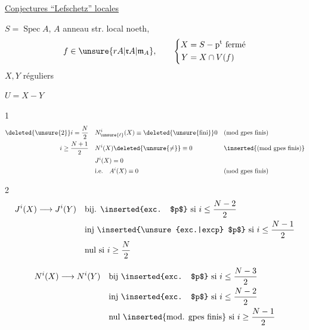 \uline{Conjectures ``Lefschetz'' locales}

$S=\operatorname{Spec} A$, \qquad $A$ anneau str. local noeth,
\[
 f\in\unsure{rA|\mathfrak r A|\mathfrak{m}_A},
 \qquad
 \left\{\begin{aligned}X&=S-\text{p\textsuperscript{t} fermé}\\Y&=X\cap V(f)\end{aligned}\right.
\]
$X,Y$ réguliers

$U=X-Y$

\textcircled{1}
\[
\begin{aligned}
 \deleted{\unsure{2}}i=\frac N2\quad&
 N^i_{\unsure{\ell}}(X)\equiv\deleted{\unsure{\text{fini}}}0
 &&\text{(mod gpes finis)}\\
 i\geq\frac{N+1}{2}\quad& N^i(X)\deleted{\unsure{\neq}}\equiv0
 &&\inserted{\text{(mod gpes finis)}}\\
 &J^i(X)=0\\
 &\text{i.e.}\quad A^i(X)\equiv0 &&\text{(mod gpes finis)}
\end{aligned}
\]

\textcircled{2}
\[
\begin{aligned}
 J^i(X)\longrightarrow J^i(Y) &\quad\text{bij. \inserted{exc. $p$} si }i\leq\frac{N-2}{2}\\
 &\quad\text{inj \inserted{\unsure{exc.|excp} $p$} si }i\leq\frac{N-1}{2}\\
 &\quad\text{nul si }i\geq\frac N2
\end{aligned}
\]
\margin{[N.B. Si $i\geq\frac N2$, $J^i(Y)=0$ ! d'ailleurs si $i\geq\frac{N+1}2$ on a $J^i(X)=J^i(Y)=0$]}

\[
\begin{aligned}
 N^i(X)\longrightarrow N^i(Y)&\quad\text{bij \inserted{exc. $p$} si } i\leq\frac{N-3}2\\
 &\quad\text{inj \inserted{exc. $p$} si } i\leq\frac{N-2}2\\
 &\quad\text{nul \inserted{mod. gpes finis} si } i\geq\frac{N-1}2
\end{aligned}
\]
\margin{[N.B si $i\geq\frac{N-1}2$, on a $N^i(Y)\equiv0$ ! si $i\geq\frac N2$, \unsure{on a} $N^i(X)=N^i(Y)\unsure{\equiv|=}0$ !]}
